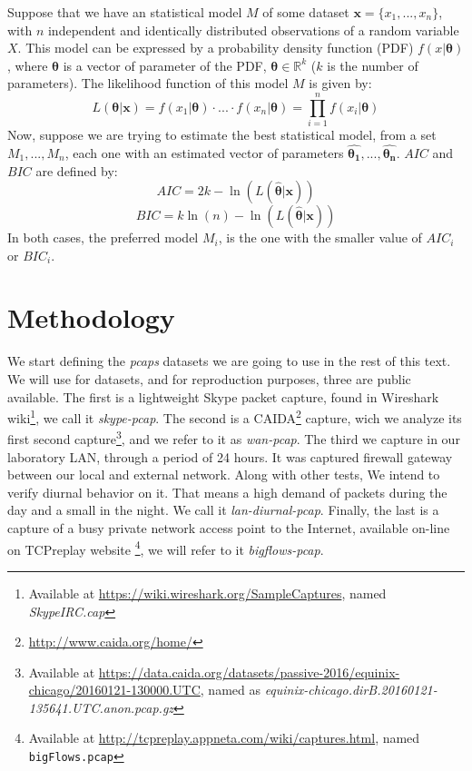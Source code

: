 Suppose that we have an statistical model $M$ of some dataset ${\boldsymbol{x} = \{x_1, ..., x_n}\}$, with $n$ independent and identically distributed observations of a random variable $X$. This model can be expressed by a probability density function (PDF) $f(x| \boldsymbol{\theta})$, where $\boldsymbol{\theta}$ is a vector of parameter of the PDF, $\boldsymbol{\theta} \in \mathbb{R}^{k}$ ($k$ is the number of parameters). The  likelihood function  of this model $M$ is given by:
\begin{equation}
L(\boldsymbol{\theta}|\boldsymbol{x} ) =  f(x_1|\boldsymbol{\theta})\cdot...\cdot f(x_n|\boldsymbol{\theta}) = \prod_{i = 1}^{n}f(x_i|\boldsymbol{\theta})
\end{equation}
Now, suppose we are trying to estimate the best statistical model, from a set ${M_1, ..., M_n}$, each one with an estimated vector of parameters  ${\boldsymbol{\hat{\theta_1}}}, ..., {\boldsymbol{\hat{\theta_n}}}$. $AIC$ and $BIC$ are defined by:
\begin{equation}
AIC = 2k - \ln(L(\boldsymbol{\hat{\theta}}|\boldsymbol{x}))
\end{equation}
\begin{equation}
BIC = k\ln(n) - \ln(L(\boldsymbol{\hat{\theta}}|\boldsymbol{x}))
\end{equation}
In both cases, the preferred model $M_i$, is the one with the smaller value of $AIC_i$ or $BIC_i$.

\section{Methodology}


We start defining the \textit{pcaps} datasets we are going to use in the rest of this text. We will use for datasets, and for reproduction purposes, three are public available. 
The first is a lightweight Skype packet capture, found in  Wireshark wiki\footnote{ Available at \url{https://wiki.wireshark.org/SampleCaptures}, named  \textit{SkypeIRC.cap}}, we call it \textit{skype-pcap}. The second is a CAIDA\footnote{ \url{http://www.caida.org/home/} } capture, wich we analyze its first second capture\footnote{Available at \url{https://data.caida.org/datasets/passive-2016/equinix-chicago/20160121-130000.UTC}, named as \textit{equinix-chicago.dirB.20160121-135641.UTC.anon.pcap.gz}  }, and we refer to it as \textit{wan-pcap}. The third we capture in our laboratory LAN, through a period of 24 hours. It was captured firewall gateway between our local and external network. Along with other tests, We intend to verify diurnal behavior on it. That means a high demand of packets during the day and a small in the night. We call it \textit{lan-diurnal-pcap}. Finally, the last is a capture of a busy private network access point to the Internet, available on-line on TCPreplay website \footnote{Available at \url{http://tcpreplay.appneta.com/wiki/captures.html}, named \texttt{bigFlows.pcap}}, we will refer to it \textit{bigflows-pcap}.

